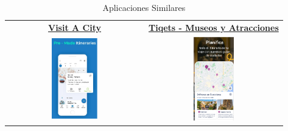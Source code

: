 \begin{table}[h!]
\begin{tabular}{cc}
	\hline
	\href{https://play.google.com/store/apps/details?id=com.visitacity}{\textbf{Visit A City}} & \href{https://play.google.com/store/apps/details?id=com.tiqets.tiqetsapp}{\textbf{Tiqets - Museos y Atracciones}} \\
	\includegraphics[width=0.35\textwidth]{img/visit_a_city.png} & \includegraphics[width=0.31\textwidth]{img/tiquets.png} \\
	\hline
	\end{tabular}
	\caption{Aplicaciones Similares}
	\label{fig:apps_similares}
	\end{table}

\newpage

